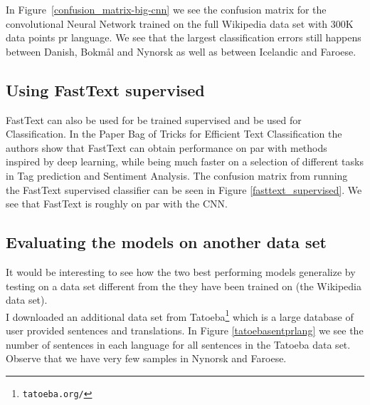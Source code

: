 
In Figure~\ref{confusion_matrix-big-cnn} we see the confusion matrix for the convolutional Neural Network trained on the full Wikipedia data set with 300K data points pr language. We see that the largest classification errors still happens between Danish, Bokmål and Nynorsk as well as between Icelandic and Faroese. \\



\subsection{Using FastText supervised}

FastText can also be used for be trained supervised and be used for Classification. In the Paper Bag of Tricks for Efficient Text Classification \cite{BagOfTricks} the authors show that FastText can obtain performance on par with methods inspired by deep learning, while being much faster on a selection of different tasks in Tag prediction and Sentiment Analysis. The confusion matrix from running the FastText supervised classifier can be seen in Figure \ref{fasttext_supervised}. We see that FastText is roughly on par with the CNN.\\

\subsection{Evaluating the models on another data set}
It would be interesting to see how the two best performing models generalize by testing on a data set different from the they have been trained on (the Wikipedia data set).\\

I downloaded an additional data set from Tatoeba\footnote{{\tt tatoeba.org/}} which is a large database of user provided sentences and translations. In Figure \ref{tatoebasentprlang} we see the number of sentences in each language for all sentences in the Tatoeba data set. Observe that we have very few samples in Nynorsk and Faroese.\\

